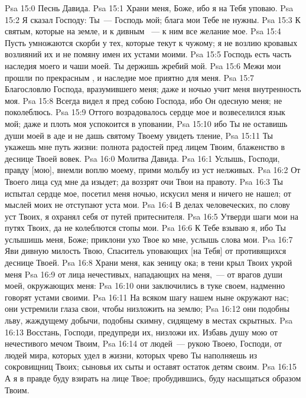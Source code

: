 \vs Psa 15:0 Песнь Давида.
\rsbpar\vs Psa 15:1 Храни меня, Боже, ибо я на Тебя уповаю.
\vs Psa 15:2 Я сказал Господу: Ты~--- Господь мой; блага мои Тебе не нужны.
\vs Psa 15:3 К святым, которые на земле, и к дивным ~--- к ним все желание мое.
\vs Psa 15:4 Пусть умножаются скорби у тех, которые текут к  чужому; я не возлию кровавых возлияний их и не помяну имен их устами моими.
\vs Psa 15:5 Господь есть часть наследия моего и чаши моей. Ты держишь жребий мой.
\vs Psa 15:6 Межи мои прошли по прекрасным , и наследие мое приятно для меня.
\vs Psa 15:7 Благословлю Господа, вразумившего меня; даже и ночью учит меня внутренность моя.
\vs Psa 15:8 Всегда видел я пред собою Господа, ибо Он одесную меня; не поколеблюсь.
\vs Psa 15:9 Оттого возрадовалось сердце мое и возвеселился язык мой; даже и плоть моя успокоится в уповании,
\vs Psa 15:10 ибо Ты не оставишь души моей в аде и не дашь святому Твоему увидеть тление,
\vs Psa 15:11 Ты укажешь мне путь жизни: полнота радостей пред лицем Твоим, блаженство в деснице Твоей вовек.
\vs Psa 16:0 Молитва Давида.
\rsbpar\vs Psa 16:1 Услышь, Господи, правду [мою], внемли воплю моему, прими мольбу из уст нелживых.
\vs Psa 16:2 От Твоего лица суд мне да изыдет; да воззрят очи Твои на правоту.
\vs Psa 16:3 Ты испытал сердце мое, посетил меня ночью, искусил меня и ничего не нашел; от мыслей моих не отступают уста мои.
\vs Psa 16:4 В делах человеческих, по слову уст Твоих, я охранял себя от путей притеснителя.
\vs Psa 16:5 Утверди шаги мои на путях Твоих, да не колеблются стопы мои.
\vs Psa 16:6 К Тебе взываю я, ибо Ты услышишь меня, Боже; приклони ухо Твое ко мне, услышь слова мои.
\vs Psa 16:7 Яви дивную милость Твою, Спаситель уповающих [на Тебя] от противящихся деснице Твоей.
\vs Psa 16:8 Храни меня, как зеницу ока; в тени крыл Твоих укрой меня
\vs Psa 16:9 от лица нечестивых, нападающих на меня,~--- от врагов души моей, окружающих меня:
\vs Psa 16:10 они заключились в туке своем, надменно говорят устами своими.
\vs Psa 16:11 На всяком шагу нашем ныне окружают нас; они устремили глаза свои, чтобы низложить  на землю;
\vs Psa 16:12 они подобны льву, жаждущему добычи, подобны скимну, сидящему в местах скрытных.
\vs Psa 16:13 Восстань, Господи, предупреди их, низложи их. Избавь душу мою от нечестивого мечом Твоим,
\vs Psa 16:14 от людей~--- рукою Твоею, Господи, от людей мира, которых удел в  жизни, которых чрево Ты наполняешь из сокровищниц Твоих; сыновья их сыты и оставят остаток детям своим.
\vs Psa 16:15 А я в правде буду взирать на лице Твое; пробудившись, буду насыщаться образом Твоим.
